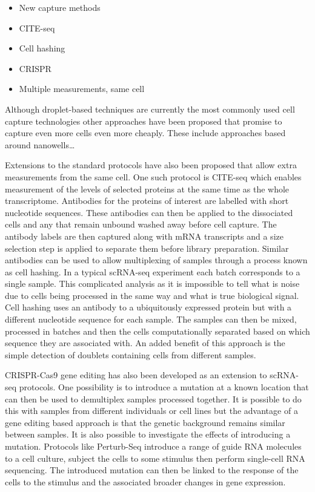 \documentclass[11pt,a4paper,titlepage,twoside,openright]{style/unimelbthesis}
\theoremstyle{definition}
\theoremstyle{definition}
\theoremstyle{definition}
\theoremstyle{remark}
\begin{document}
\begin{mainmatter}
\begin{itemize}
\tightlist
\item
  New capture methods
\item
  CITE-seq
\item
  Cell hashing
\item
  CRISPR
\item
  Multiple measurements, same cell
\end{itemize}

Although droplet-based techniques are currently the most commonly used cell capture technologies other approaches have been proposed that promise to capture even more cells even more cheaply. These include approaches based around nanowells\ldots{}

Extensions to the standard protocols have also been proposed that allow extra measurements from the same cell. One such protocol is CITE-seq which enables measurement of the levels of selected proteins at the same time as the whole transcriptome. Antibodies for the proteins of interest are labelled with short nucleotide sequences. These antibodies can then be applied to the dissociated cells and any that remain unbound washed away before cell capture. The antibody labels are then captured along with mRNA transcripts and a size selection step is applied to separate them before library preparation. Similar antibodies can be used to allow multiplexing of samples through a process known as cell hashing. In a typical scRNA-seq experiment each batch corresponds to a single sample. This complicated analysis as it is impossible to tell what is noise due to cells being processed in the same way and what is true biological signal. Cell hashing uses an antibody to a ubiquitously expressed protein but with a different nucleotide sequence for each sample. The samples can then be mixed, processed in batches and then the cells computationally separated based on which sequence they are associated with. An added benefit of this approach is the simple detection of doublets containing cells from different samples.

CRISPR-Cas9 gene editing has also been developed as an extension to scRNA-seq protocols. One possibility is to introduce a mutation at a known location that can then be used to demultiplex samples processed together. It is possible to do this with samples from different individuals or cell lines but the advantage of a gene editing based approach is that the genetic background remains similar between samples. It is also possible to investigate the effects of introducing a mutation. Protocols like Perturb-Seq introduce a range of guide RNA molecules to a cell culture, subject the cells to some stimulus then perform single-cell RNA sequencing. The introduced mutation can then be linked to the response of the cells to the stimulus and the associated broader changes in gene expression.


\end{mainmatter}
\end{document}
